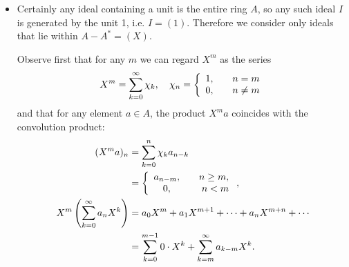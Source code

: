 \documentclass{article}
\begin{document}
\begin{Answer}
\begin{enumerate}[(a)]
{\begin{itemize}
{          Suppose for some $n > 0$ that $b_k = 0$ for
          $0 \leq k < n-1$. Then
          \begin{align*}
            0 = (ab)_{n + r_0}
             &= \sum_{k=0}^{n + r_0} a_k b_{n + r_0 - k} \\
             &= a_0 b_{n + r_0}
              + a_1 b_{n + r_0 - 1}
              + \cdots
              + a_{r_0} b_n
              + a_{r_0 + 1} b_{n - 1}
              + \cdots
              + a_{n + r_0} b_0 \\
             &= \sum_{k=0}^{r_0 - 1} a_k b_{r_0 - 1 - k}
              + a_{r_0} b_n
              + \sum_{k=1}^{n} a_{r_0 + k} b_{n - k} \\
             &= 0 + a_{r_0} b_n + 0
          \end{align*}
          so that $b_n = 0$ since $\mathbb{C}$ is an integral domain.

          Therefore $a b = 0$ implies $a = 0$ or $b = 0$, so $\mathbb{C}[[x]]$
          is an integral domain.
        }
        \item{
          Certainly any ideal containing a unit is the entire ring
          $A$, so any such ideal $I$ is generated by the unit 1,
          i.e. $I = (1)$. Therefore we consider only ideals that
          lie within $A - A^\ast = (X)$.

          Observe first that for any $m$ we can regard $X^m$ as the
          series
          $$
          X^m = \sum_{k=0}^\infty \chi_k, \quad
          \chi_n = \left\{\begin{array}{c r}
                     1, & \quad n = m \\
                     0, & \quad n \neq m
                   \end{array}\right.
          $$
          and that for any element $a \in A$, the product $X^m a$ coincides with the
          convolution product:
          \begin{align*}
             (X^m a)_n
          &= \sum_{k=0}^n \chi_k a_{n-k} \\
          &= \left\{\begin{array}{c r}
               a_{n-m}, & \quad n \geq m, \\
               0,      & \quad n < m
             \end{array}\right., \\
             X^m \left( \sum_{k=0}^\infty a_n X^k \right)
          &= a_0 X^m
           + a_1 X^{m+1}
           + \cdots
           + a_n X^{m+n}
           + \cdots \\
          &= \sum_{k=0}^{m-1} 0 \cdot X^k + \sum_{k=m}^\infty a_{k-m} X^k.
          \end{align*}

}
\end{itemize}}
\end{enumerate}
\end{Answer}
\end{document}
